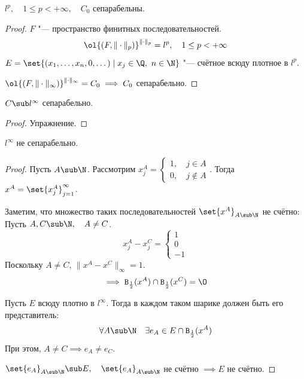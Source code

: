 \begin{implication}
	$ l^p, \quad 1 \le p < +\infty, \quad C_0 $ сепарабельны.
\end{implication}

\begin{proof}
	$ F $ "--- пространство финитных последовательностей.
	$$ \ol{(F, \|\cdot\|_p)}^{\|\cdot\|_p} = l^p, \quad 1 \le p < +\infty $$
	$ E = \set{(x_1, \dots, x_n, 0, \dots) \mid x_j \in \Q, ~ n \in \N} $ "--- счётное всюду
	плотное в $ l^p $.

	$ \ol{(F, \|\cdot\|_\infty)}^{\|\cdot\|_\infty} = C_0 \implies C_0 $ сепарабельно.
\end{proof}

\begin{statement}
	$ C \sub l^\infty $ сепарабельно.
\end{statement}

\begin{proof}
	Упражнение.
\end{proof}

\begin{theorem}
	$ l^\infty $ не сепарабельно.
\end{theorem}

\begin{proof}
	Пусть $ A \sub \N $.
	Рассмотрим $ x_j^A = 
	\begin{cases}
		1, \quad j \in A \\
		0, \quad j \notin A
	\end{cases} $.
	Тогда $ x^A = \set{x_j^A}_{j = 1}^\infty $.

	Заметим, что множество таких последовательностей $ \set{x^A}_{A \sub \N} $ не счётно: \\
	Пусть $ A, C \sub \N, \quad A \ne C $.
	$$ x_j^A - x_j^C =
	\begin{cases}
		1 \\
		0 \\
		-1
	\end{cases} $$
	Поскольку $ A \ne C $, $ \|x^A - x^C\|_\infty = 1 $.
	$$ \implies \mathtt B_{\frac12}(x^A) \cap \mathtt B_{\frac12}(x^C) = \O $$

	Пусть $ E $ всюду плотно в $ l^\infty $.
	Тогда в каждом таком шарике должен быть его представитель:
	$$ \forall A \sub \N \quad \exists e_A \in E \cap \mathtt B_{\frac12}(x^A) $$
	При этом, $ A \ne C \implies e_A \ne e_C $.

	$ \set{e_A}_{A \sub \N} \sub E, \quad \set{e_A}_{A \sub \N} $ не счётно $ \implies E $ не счётно.
\end{proof}

